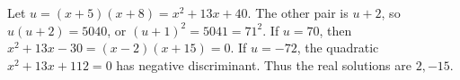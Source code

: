 Let $u=(x+5)(x+8)=x^2+13x+40$. The other pair is $u+2$, so $u(u+2)=5040$, or $(u+1)^2=5041=71^2$. If $u=70$, then $x^2+13x-30=(x-2)(x+15)=0$. If $u=-72$, the quadratic $x^2+13x+112=0$ has negative discriminant. Thus the real solutions are $\boxed{2,-15}$.
